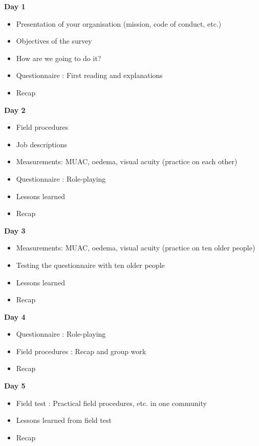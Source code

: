 \documentclass[12pt,a4paper]{book}
\providecommand{\tightlist}{%
  \setlength{\itemsep}{0pt}\setlength{\parskip}{0pt}}
\begin{document}
\textbf{Day 1}

\begin{itemize}
\tightlist
\item
  Presentation of your organisation (mission, code of conduct, etc.)
\item
  Objectives of the survey
\item
  How are we going to do it?
\item
  Questionnaire : First reading and explanations
\item
  Recap
\end{itemize}

\textbf{Day 2}

\begin{itemize}
\tightlist
\item
  Field procedures
\item
  Job descriptions
\item
  Measurements: MUAC, oedema, visual acuity (practice on each other)
\item
  Questionnaire : Role-playing
\item
  Lessons learned
\item
  Recap
\end{itemize}

\textbf{Day 3}

\begin{itemize}
\tightlist
\item
  Measurements: MUAC, oedema, visual acuity (practice on ten older people)
\item
  Testing the questionnaire with ten older people
\item
  Lessons learned
\item
  Recap
\end{itemize}

\textbf{Day 4}

\begin{itemize}
\tightlist
\item
  Questionnaire : Role-playing
\item
  Field procedures : Recap and group work
\item
  Recap
\end{itemize}

\textbf{Day 5}

\begin{itemize}
\tightlist
\item
  Field test : Practical field procedures, etc. in one community
\item
  Lessons learned from field test
\item
  Recap
\end{itemize}
\end{document}
